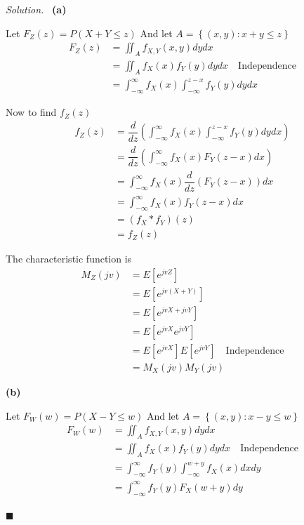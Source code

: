 \documentclass[11pt]{article}
\newenvironment{solution}
{\par\medskip\noindent\textit{Solution.}\ }
{\hfill$\blacksquare$\par\medskip}
\begin{document}
    \begin{solution}
        \textbf{(a)}

        Let $F_Z(z) = P(X + Y \le z)$
        And let $A = \left\{ (x, y): x + y \le z \right\}$
        \begin{align*}
            F_Z(z) &= \iint_{A} f_{X, Y}(x, y) dy dx \\
            &= \iint_{A} f_X(x)f_Y(y) dy dx \quad \text{Independence} \\
            &= \int_{-\infty}^{\infty} f_X(x) \int_{-\infty}^{z - x} f_Y(y) dy dx
        \end{align*}

        Now to find $f_Z(z)$
        \begin{align*}
            f_Z(z) &= \dfrac{d}{dz} \left(\int_{-\infty}^{\infty} f_X(x) \int_{-\infty}^{z - x} f_Y(y) dy dx \right) \\
            &= \dfrac{d}{dz} \left(\int_{-\infty}^{\infty} f_X(x) F_Y(z - x) dx \right) \\
            &= \int_{-\infty}^{\infty} f_X(x) \dfrac{d}{dz} \left(F_Y(z - x)\right) dx \\
            &= \int_{-\infty}^{\infty} f_X(x) f_Y(z - x) dx \\
            &= \left( f_X * f_Y \right)(z) \\
            &= f_Z(z)
        \end{align*}

        The characteristic function is
        \begin{align*}
            M_Z(jv) &= E[e^{jvZ}] \\
            &= E[e^{jv(X + Y)}] \\
            &= E[e^{jvX + jvY}] \\
            &= E[e^{jvX}e^{jvY}] \\
            &= E[e^{jvX}]E[e^{jvY}] \quad \text{Independence} \\
            &= M_X(jv) M_Y(jv)
        \end{align*}

        \vspace{1em}
        \textbf{(b)}

        Let $F_W(w) = P(X - Y \le w)$
        And let $A = \left\{ (x, y): x - y \le w \right\}$
        \begin{align*}
            F_W(w) &= \iint_{A} f_{X, Y}(x, y) dy dx \\
            &= \iint_{A} f_X(x)f_Y(y) dy dx \quad \text{Independence} \\
            &= \int_{-\infty}^{\infty} f_Y(y) \int_{-\infty}^{w + y} f_X(x) dx dy \\
            &= \int_{-\infty}^{\infty} f_Y(y) F_X(w + y) dy
        \end{align*}


\end{solution}
\end{document}
